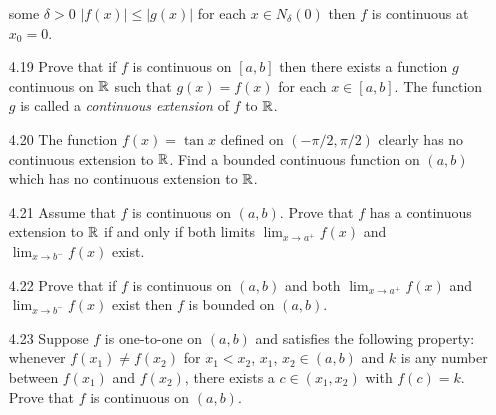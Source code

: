 \begin{enumerate}
               some $\delta > 0$ $|f(x)| \le |g(x)|$ for each
               $x \in N_\delta(0)$ then $f$ is continuous at $x_0 = 0$.
   \item[4.19] Prove that if $f$ is continuous on $[a, b]$ then there exists a
               function $g$ continuous on $\mathbb{R}$ such that $g(x) = f(x)$ for each
               $x \in [a, b]$. The function $g$ is called a
               \textit{continuous extension} of $f$ to $\mathbb{R}$.
   \item[4.20] The function $f(x) = \tan x$ defined on $(-\pi/2, \pi/2)$ clearly
               has no continuous extension to $\mathbb{R}$. Find a bounded continuous
               function on $(a, b)$ which has no continuous extension to $\mathbb{R}$.
   \item[4.21] Assume that $f$ is continuous on $(a, b)$. Prove that $f$ has a
               continuous extension to $\mathbb{R}$ if and only if both limits
               $\lim_{x\rightarrow a^+}f(x)$ and $\lim_{x\rightarrow b^-}f(x)$
               exist.
   \item[4.22] Prove that if $f$ is continuous on $(a, b)$ and both
               $\lim_{x\rightarrow a^+}f(x)$ and $\lim_{x\rightarrow b^-}f(x)$
               exist then $f$ is bounded on $(a, b)$.
   \item[4.23] Suppose $f$ is one-to-one on $(a, b)$ and satisfies the following
               property: whenever $f(x_1) \neq f(x_2)$ for $x_1 < x_2$, $x_1$,
               $x_2 \in (a, b)$ and $k$ is any number between $f(x_1)$ and
               $f(x_2)$, there exists a $c \in (x_1, x_2)$ with $f(c) = k$.
               Prove that $f$ is continuous on $(a, b)$.
\end{enumerate}

